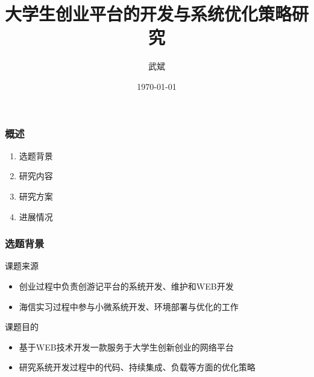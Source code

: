 \documentclass{beamer}
\title{大学生创业平台的开发与系统优化策略研究}
\author{武斌}
\institute
{
  电子系~中国海洋大学
  \and
   Department electronic engineering \\
  Ocean University Of China
}
\date{\today}
\begin{document}
\begin{frame}
  \titlepage
\end{frame}


\begin{frame}
  \frametitle{概述}
  \begin{enumerate}
    \item<1-> 选题背景
    \item<1-> 研究内容
    \item<1-> 研究方案
    \item<1-> 进展情况
  \end{enumerate}
\end{frame}


\begin{frame}
  \frametitle{选题背景}
  \begin{block}{课题来源}
  	\begin{itemize}
  		\item 创业过程中负责创游记平台的系统开发、维护和WEB开发
  		\item 海信实习过程中参与小微系统开发、环境部署与优化的工作
  	\end{itemize}
  \end{block}
  \begin{block}{课题目的}
  	\begin{itemize}
  		\item 基于WEB技术开发一款服务于大学生创新创业的网络平台
  		\item 研究系统开发过程中的代码、持续集成、负载等方面的优化策略
  	\end{itemize}
  \end{block}
\end{frame}
\end{document}
